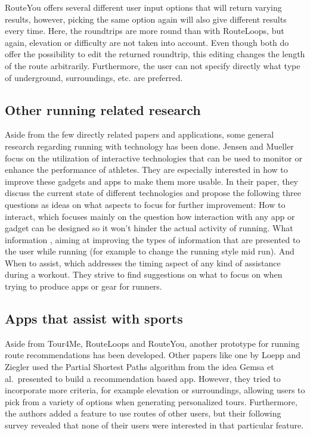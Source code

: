 RouteYou offers several different user input options that will return varying results, however, picking the same option again will also give different results every time.   
Here, the roundtrips are more round than with RouteLoops, but again, elevation or difficulty are not taken into account. 
Even though both do offer the possibility to edit the returned roundtrip, this editing changes the length of the route arbitrarily.
Furthermore, the user can not specify directly what type of underground, surroundings, etc. are preferred. 




\subsection{Other running related research}
\label{subsec:otherRunningResearch}

Aside from the few directly related papers and applications, some general research regarding running with technology has been done.
Jensen and Mueller \cite{jensen_running_2014} focus on the utilization of interactive technologies that can be used to monitor or enhance the performance of athletes.
They are especially interested in how to improve these gadgets and apps to make them more usable. 
In their paper, they discuss the current state of different technologies and propose the following three questions as ideas on what aspects to focus for further improvement:
\glqq How to interact\grqq , which focuses mainly on the question how interaction with any app or gadget can be designed so it won't hinder the actual activity of running.
\glqq What information \grqq , aiming at improving the types of information that are presented to the user while running (for example to change the running style mid run).
And \glqq When to assist\grqq , which addresses the timing aspect of any kind of assistance during a workout. 
They strive to find suggestions on what to focus on when trying to produce apps or gear for runners.



\subsection{Apps that assist with sports}
\label{subsec:runningApps}

Aside from Tour4Me, RouteLoops and RouteYou, another prototype for running route recommendations has been developed.
Other papers like one by Loepp and Ziegler \cite{loepp_recommending_2018} used the Partial Shortest Paths algorithm from the idea Gemsa et al.\ presented \cite{gemsa_efficient_2013} to build a recommendation based app.
However, they tried to incorporate more criteria, for example elevation or surroundings, allowing users to pick from a variety of options when generating personalized tours. 
Furthermore, the authors added a feature to use routes of other users, but their following survey revealed that none of their users were interested in that particular feature.

